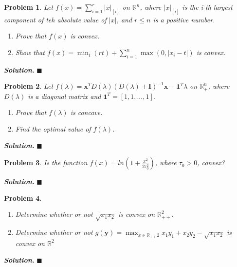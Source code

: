 \documentclass[12pt]{article}
\newtheorem{problem}{Problem}
\newenvironment{solution}[1][\textit{Solution}]{\textbf{#1. }}{$\blacksquare$}
\begin{document}
  \begin{problem}
    Let $f(x) = \sum_{i=1}^{r} |x|_{[i]}$ on $\mathbb{R}^n$, where $|x|_{[i]}$ is the \it{i}-th largest component of teh absolute value of $|x|$, and $r \leq n$ is a positive number. 
    \begin{enumerate}
      \item Prove that $f(x)$ is convex.
      \item Show that $f(x) = \min_{t}(rt) + \sum_{i=1}^{n} \max(0, |x_{i} - t|)$ is convex.
    \end{enumerate}
  \end{problem}
  \begin{solution}
  \end{solution}

  \begin{problem}
    Let $f(\lambda) = \textbf{x}^{T} D(\lambda)(D(\lambda) + \textbf{I})^{-1}\textbf{x} - \textbf{1}^{T}\lambda$ on $\mathbb{R}^{n}_{+}$, where $D(\lambda)$ is a diagonal matrix and $\textbf{1}^T = [1, 1, ..., 1]$.
    \begin{enumerate}
      \item Prove that $f(\lambda)$ is concave.
      \item Find the optimal value of $f(\lambda)$.
    \end{enumerate}
  \end{problem}
  \begin{solution}
  \end{solution}

 \begin{problem}
   Is the function $f(x) = ln(1 + \frac{x^2}{2 \tau^{2}_{0}})$, where $\tau_{0} > 0$, convex?
  \end{problem}
  \begin{solution}
  \end{solution}

  \begin{problem}
    \begin{enumerate}
      \item Determine whether or not $\sqrt{x_{1}x_{2}}$ is convex on $\mathbb{R}^{2}_{++}$.
    \item Determine whether or not $g(\textbf{y}) = \max_{x \in \mathbb{R}_{++}{2}} x_{1}y_{1} + x_{2}y_{2} - \sqrt{x_{1}x_{2}}$ is convex on $\mathbb{R}^2$
    \end{enumerate}
  \end{problem}
  \begin{solution}
  \end{solution}
\end{document}
